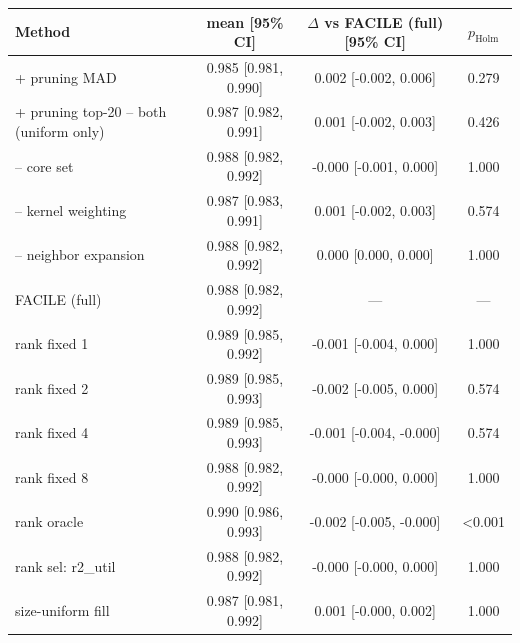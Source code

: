 \begin{tabular}{lccc}
\toprule
Method & mean [95\% CI] & $\Delta$ vs FACILE (full) [95\% CI] & $p_{\mathrm{Holm}}$ \\
\midrule
+ pruning MAD & 0.985 [0.981, 0.990] & 0.002 [-0.002, 0.006] & 0.279 \\
+ pruning top-20%
-- both (uniform only) & 0.987 [0.982, 0.991] & 0.001 [-0.002, 0.003] & 0.426 \\
-- core set & 0.988 [0.982, 0.992] & -0.000 [-0.001, 0.000] & 1.000 \\
-- kernel weighting & 0.987 [0.983, 0.991] & 0.001 [-0.002, 0.003] & 0.574 \\
-- neighbor expansion & 0.988 [0.982, 0.992] & 0.000 [0.000, 0.000] & 1.000 \\
FACILE (full) & 0.988 [0.982, 0.992] & --- & --- \\
rank fixed 1 & 0.989 [0.985, 0.992] & -0.001 [-0.004, 0.000] & 1.000 \\
rank fixed 2 & 0.989 [0.985, 0.993] & -0.002 [-0.005, 0.000] & 0.574 \\
rank fixed 4 & 0.989 [0.985, 0.993] & -0.001 [-0.004, -0.000] & 0.574 \\
rank fixed 8 & 0.988 [0.982, 0.992] & -0.000 [-0.000, 0.000] & 1.000 \\
rank oracle & 0.990 [0.986, 0.993] & -0.002 [-0.005, -0.000] & <0.001 \\
rank sel: r2_util & 0.988 [0.982, 0.992] & -0.000 [-0.000, 0.000] & 1.000 \\
size-uniform fill & 0.987 [0.981, 0.992] & 0.001 [-0.000, 0.002] & 1.000 \\
\bottomrule
\end{tabular}

